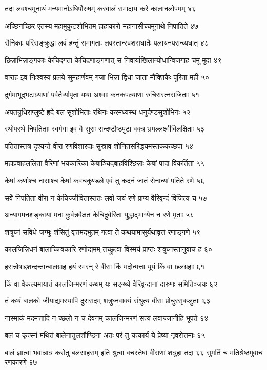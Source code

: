 तदा लवश्चमूनाथं मन्यमानोऽधिपौरुषम्
करवालं समादाय करे कालानलोपमम् ४६

अच्छिनच्छिर एतस्य महामुकुटशोभितम्
हाहाकारो महानासीच्चमूनाथे निपातिते ४७

सैनिकाः परिसङ्क्रुद्धा लवं हन्तुं समागताः
लवस्तान्स्वशराघातैः पलायनपरान्व्यधात् ४८

छिन्नाभिन्नाङ्गकाः केचिद्गता केचिद्रणाङ्गणात्
स निवार्याखिलान्योधान्विजगाह चमूं मुदा ४९

वाराह इव निःश्वस्य प्रलये सुमहार्णवम्
गजा भिन्ना द्विधा जाता मौक्तिकैः पूरिता मही ५०

दुर्गमाभूद्भटाग्र्याणां पर्वतैर्व्यापृता यथा
अश्वाः कनकपल्याणा रुचिरारत्नराजिताः ५१

अपतन्रुधिराप्लुष्टे ह्रदे बल सुशोभिताः
रथिनः करमध्यस्थ धनुर्दण्डसुशोभिनः ५२

रथोपस्थे निपतिताः स्वर्गगा इव वै सुराः
सन्दष्टौष्ठपुटा वक्त्र भ्रमल्लक्ष्मीविलक्षिताः ५३

पतितास्तत्र दृश्यन्ते वीरा रणविशारदाः
सुस्राव शोणितसरिद्धयमस्तककच्छपा ५४

महाप्रवाहललिता वैरिणां भयकारिका
केषाञ्चिद्बाहविश्छिन्नाः केषां पादा विकर्तिता ५५

केषां कर्णाश्च नासाश्च केषां कवचकुण्डले
एवं तु कदनं जातं सेनान्यां पतिते रणे ५६

सर्वे निपतिता वीरा न केचिज्जीवितास्ततः
लवो जयं रणे प्राप्य वैरिवृन्दं विजित्य च ५७

अन्यागमनशङ्कायां मनः कुर्वन्नवैक्षत
केचिदुर्वरिता युद्धाद्भाग्येन न रणे मृताः ५८

शत्रुघ्नं सविधे जग्मुः शंसितुं वृत्तमद्भुतम्
गत्वा ते कथयामासुर्यथावृत्तं रणाङ्गणे ५९

कालजिन्निधनं बालाच्चित्रकारि रणोद्यमम्
तच्छ्रुत्वा विस्मयं प्राप्तः शत्रुघ्नस्तानुवाच ह ६०

हसन्रोषाद्दशन्दन्तान्बालग्राह हयं स्मरन्
रे वीराः किं मदोन्मत्ता यूयं किं वा छलग्रहाः ६१

किं वा वैकल्यमायातं कालजिन्मरणं कथम्
यः सङ्ख्ये वैरिवृन्दानां दारुणः समितिञ्जयः ६२

तं कथं बालको जीयाद्यमस्यापि दुरासदम्
शत्रुघ्नवाक्यं संश्रुत्य वीराः प्रोचुरसृक्प्लुताः ६३

नास्माकं मदमत्तादि न च्छलो न च देवनम्
कालजिन्मरणं सत्यं लवाज्जानीहि भूपते ६४

बलं च कृत्स्नं मथितं बालेनातुलशौण्डिना
अतः परं तु यत्कार्यं ये प्रेष्या नृवरोत्तमाः ६५

बालं ज्ञात्वा भवान्नात्र करोतु बलसाहसम्
इति श्रुत्वा वचस्तेषां वीराणां शत्रुहा तदा ६६
सुमतिं च मतिश्रेष्ठमुवाच रणकारणे ६७

